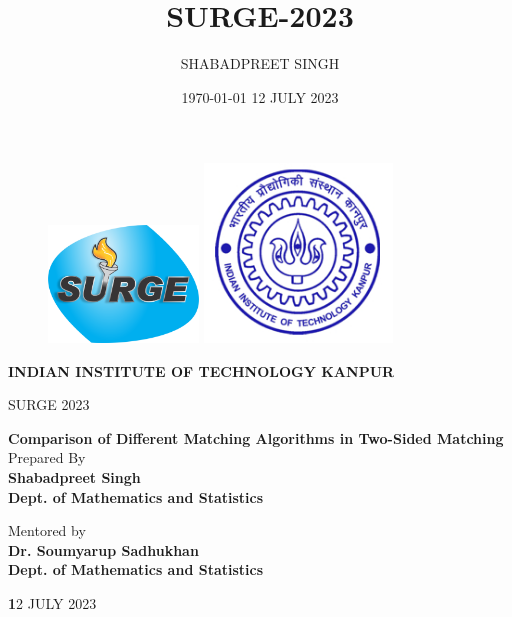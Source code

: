 \documentclass{article}
\title{SURGE-2023}
\author{SHABADPREET SINGH}
\date{\today}
\begin{document}
\thispagestyle{empty}

	\begin{figure}[ht]
			\includegraphics[width=4cm]{logo_surge.png}
			\label{EscudoUABC}
	   \endminipage
			\includegraphics[height = 4.5 cm ,width=5.0cm]{iitk_logo.jpg}
			\label{EscudoFC}
		\endminipage
	\end{figure}
	
	\begin{center}
	\vspace{0.8cm}
	\LARGE
	\textbf{INDIAN INSTITUTE OF TECHNOLOGY KANPUR}
	
	\vspace{0.5cm}
	\LARGE
	SURGE 2023
	
	\vspace{2.1cm}	
	\Large
\textbf{\huge Comparison of Different Matching Algorithms in Two-Sided Matching}
	\vspace{3.3cm}
	\normalsize	
	\\ \large Prepared By \\
	\vspace{.3cm}
	\large
	\textbf{\Large Shabadpreet Singh\\ Dept. of Mathematics and Statistics}
	
	\vspace{1.3cm}
	\normalsize	
	   \large Mentored by  \\
	\vspace{.3cm}
	\large
	\textbf{\Large Dr. Soumyarup Sadhukhan \\ Dept. of Mathematics and Statistics } 
	
	
	\vspace{2.3cm}
	\date{ 12 JULY 2023}
        {\textbf12 JULY 2023}
	\end{center}
	
	\newpage
	
\end{document}
